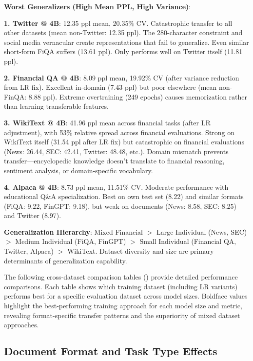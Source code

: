 \textbf{Worst Generalizers (High Mean PPL, High Variance)}:

\textbf{1. Twitter @ 4B}: 12.35 ppl mean, 20.35\% CV. Catastrophic transfer to all other datasets (mean non-Twitter: 12.35 ppl). The 280-character constraint and social media vernacular create representations that fail to generalize. Even similar short-form FiQA suffers (13.61 ppl). Only performs well on Twitter itself (11.81 ppl).

\textbf{2. Financial QA @ 4B}: 8.09 ppl mean, 19.92\% CV (after variance reduction from LR fix). Excellent in-domain (7.43 ppl) but poor elsewhere (mean non-FinQA: 8.88 ppl). Extreme overtraining (249 epochs) causes memorization rather than learning transferable features.

\textbf{3. WikiText @ 4B}: 41.96 ppl mean across financial tasks (after LR adjustment), with \~53\% relative spread across financial evaluations. Strong on WikiText itself (31.54 ppl after LR fix) but catastrophic on financial evaluations (News: 26.44, SEC: 42.41, Twitter: 48.48, etc.). Domain mismatch prevents transfer—encyclopedic knowledge doesn't translate to financial reasoning, sentiment analysis, or domain-specific vocabulary.

\textbf{4. Alpaca @ 4B}: 8.73 ppl mean, 11.51\% CV. Moderate performance with educational Q\&A specialization. Best on own test set (8.22) and similar formats (FiQA: 9.22, FinGPT: 9.18), but weak on documents (News: 8.58, SEC: 8.25) and Twitter (8.97).

\textbf{Generalization Hierarchy}: Mixed Financial $>$ Large Individual (News, SEC) $>$ Medium Individual (FiQA, FinGPT) $>$ Small Individual (Financial QA, Twitter, Alpaca) $>$ WikiText. Dataset diversity and size are primary determinants of generalization capability.

The following cross-dataset comparison tables () provide detailed performance comparisons. Each table shows which training dataset (including LR variants) performs best for a specific evaluation dataset across model sizes. Boldface values highlight the best-performing training approach for each model size and metric, revealing format-specific transfer patterns and the superiority of mixed dataset approaches.

\subsection{Document Format and Task Type Effects}

